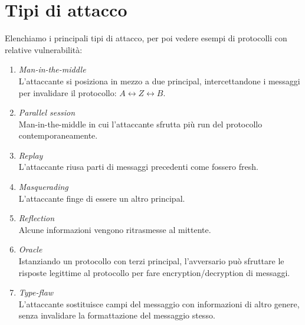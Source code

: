 \documentclass[a4paper, 11pt, twoside, openright, fleqn]{report}
\begin{document}
\section{Tipi di attacco}
Elenchiamo i principali tipi di attacco, per poi vedere esempi di protocolli con relative vulnerabilità:
\begin{enumerate}
	\item \emph{Man-in-the-middle}\\
	L'attaccante si posiziona in mezzo a due principal, intercettandone i messaggi per invalidare il protocollo: $A \leftrightarrow Z \leftrightarrow B$.
	\item \emph{Parallel session}\\
	Man-in-the-middle in cui l'attaccante sfrutta più run del protocollo contemporaneamente.
	\item \emph{Replay}\\
	L'attaccante riusa parti di messaggi precedenti come fossero fresh.
	\item \emph{Masquerading}\\
	L'attaccante finge di essere un altro principal.
	\item \emph{Reflection}\\
	Alcune informazioni vengono ritrasmesse al mittente.
	\item \emph{Oracle}\\
	Istanziando un protocollo con terzi principal, l'avversario può sfruttare le risposte legittime al protocollo per fare encryption/decryption di messaggi.
	\item \emph{Type-flaw}\\
	L'attaccante sostituisce campi del messaggio con informazioni di altro genere, senza invalidare la formattazione del messaggio stesso.
\end{enumerate}
\end{document}
